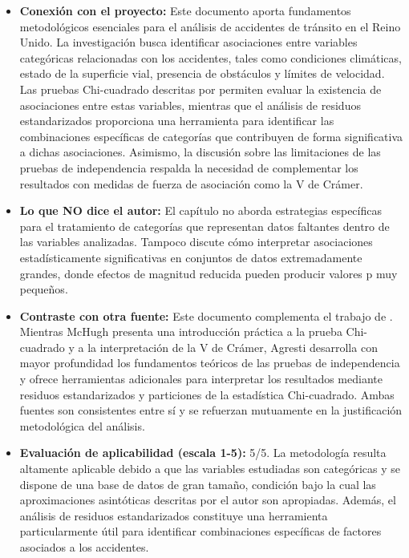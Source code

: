 \documentclass[12pt]{article}
\begin{document}
\begin{itemize}
\item \textbf{Conexión con el proyecto:} Este documento aporta fundamentos metodológicos esenciales para el 
análisis de accidentes de tránsito en el Reino Unido. La investigación busca identificar asociaciones entre variables 
categóricas relacionadas con los accidentes, tales como condiciones climáticas, estado de la superficie vial, presencia de 
obstáculos y límites de velocidad. Las pruebas Chi-cuadrado descritas por \textcite{Agresti2002} permiten evaluar la existencia 
de asociaciones entre estas variables, mientras que el análisis de residuos estandarizados proporciona una herramienta para 
identificar las combinaciones específicas de categorías que contribuyen de forma significativa a dichas asociaciones. 
Asimismo, la discusión sobre las limitaciones de las pruebas de independencia respalda la necesidad de complementar 
los resultados con medidas de fuerza de asociación como la V de Crámer.

\item \textbf{Lo que NO dice el autor:} El capítulo no aborda estrategias específicas para el tratamiento de categorías 
que representan datos faltantes dentro de las variables analizadas. Tampoco discute cómo interpretar asociaciones 
estadísticamente significativas en conjuntos de datos extremadamente grandes, donde efectos de magnitud reducida 
pueden producir valores p muy pequeños.

\item \textbf{Contraste con otra fuente:} Este documento complementa el trabajo de \textcite{McHugh2013}. Mientras McHugh 
presenta una introducción práctica a la prueba Chi-cuadrado y a la interpretación de la V de Crámer, Agresti desarrolla con 
mayor profundidad los fundamentos teóricos de las pruebas de independencia y ofrece herramientas adicionales para interpretar 
los resultados mediante residuos estandarizados y particiones de la estadística Chi-cuadrado. Ambas fuentes son consistentes 
entre sí y se refuerzan mutuamente en la justificación metodológica del análisis.

\item \textbf{Evaluación de aplicabilidad (escala 1-5):} 5/5. La metodología resulta altamente aplicable debido a 
que las variables estudiadas son categóricas y se dispone de una base de datos de gran tamaño, condición bajo la cual las 
aproximaciones asintóticas descritas por el autor son apropiadas. Además, el análisis de residuos estandarizados constituye 
una herramienta particularmente útil para identificar combinaciones específicas de factores asociados a los accidentes.


\end{itemize}
\end{document}
